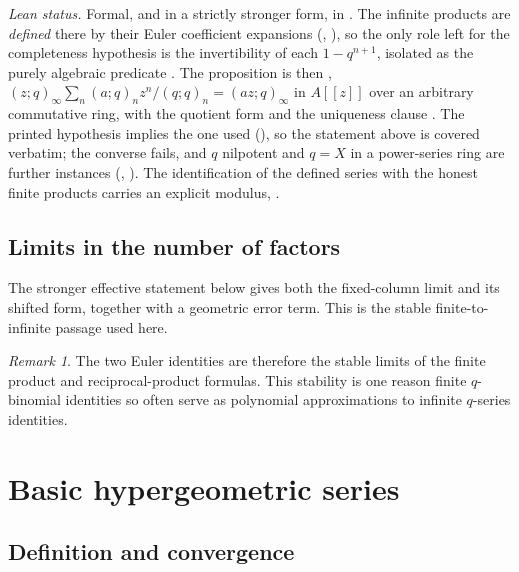 \documentclass[11pt,a4paper,oneside,openany]{book}
\theoremstyle{definition}
\theoremstyle{remark}
\newtheorem{remark}[remark]{Remark}
\begin{document}
\emph{Lean status.}  Formal, and in a strictly stronger form, in .
The infinite products are \emph{defined} there by their Euler coefficient expansions
(, ), so the only role left for the
completeness hypothesis is the invertibility of each $1-q^{n+1}$, isolated as the purely algebraic
predicate .  The proposition is then
, $(z;q)_\infty\sum_n(a;q)_nz^n/(q;q)_n=(az;q)_\infty$
in $A[[z]]$ over an arbitrary commutative ring, with the quotient form
 and the uniqueness clause
.  The printed hypothesis implies the one used
(), so the statement above is covered verbatim; the
converse fails, and $q$ nilpotent and $q=X$ in a power-series ring are further instances
(, ).  The identification of the
defined series with the honest finite products carries an explicit modulus,
.


\section{Limits in the number of factors}

The stronger effective statement  below gives
both the fixed-column limit and its shifted form, together with a geometric
error term.  This is the stable finite-to-infinite passage used here.

\begin{remark}
The two Euler identities are therefore the stable limits of the finite product and reciprocal-product formulas.  This stability is one reason finite $q$-binomial identities so often serve as polynomial approximations to infinite $q$-series identities.
\end{remark}

\chapter{Basic hypergeometric series}\label{chap:basic-hypergeometric}

\section{Definition and convergence}
\end{document}
